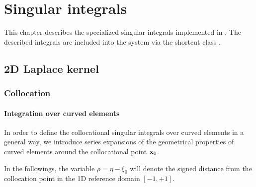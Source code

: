 \chapter{Singular integrals}

This chapter describes the specialized singular integrals implemented in \NiHu{}.
The described integrals are included into the system via the shortcut class .

\section{2D Laplace kernel}

\subsection{Collocation}

\subsubsection{Integration over curved elements}

In order to define the collocational singular integrals over curved elements in a general way, we introduce series expansions of the geometrical properties of curved elements around the collocational point ${\bf x}_0$.

In the followings, the variable $\rho = \eta - \xi_0$ will denote the signed distance from the collocation point in the 1D reference domain $[-1, +1]$.

